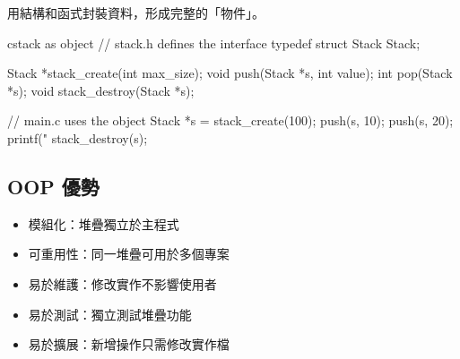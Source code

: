 用結構和函式封裝資料，形成完整的「物件」。

\begin{code}{c}{stack as object}
// stack.h defines the interface
typedef struct Stack Stack;

Stack *stack_create(int max_size);
void push(Stack *s, int value);
int pop(Stack *s);
void stack_destroy(Stack *s);

// main.c uses the object
Stack *s = stack_create(100);
push(s, 10);
push(s, 20);
printf("%
stack_destroy(s);
\end{code}

\subsection*{OOP 優勢}

\begin{itemize}
\item 模組化：堆疊獨立於主程式
\item 可重用性：同一堆疊可用於多個專案
\item 易於維護：修改實作不影響使用者
\item 易於測試：獨立測試堆疊功能
\item 易於擴展：新增操作只需修改實作檔
\end{itemize}

